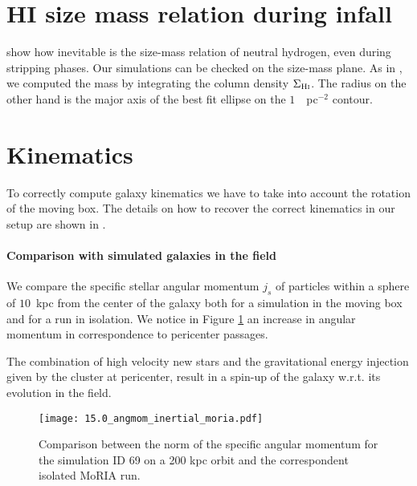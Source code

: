 \section{HI size mass relation during infall}
\citet{Stevens2019} show how inevitable is the size-mass relation of neutral hydrogen, even during stripping phases.
Our simulations can be checked on the size-mass plane.
As in \citet{Verbeke2017}, we computed the \Hi{} mass by integrating the \Hi{} column density $\Sigma_{\text{H\textsc{i}}}$. The radius on the other hand is the major axis of the best fit ellipse on the $1$~\Msun{}~pc$^{-2}$ contour.


\section{Kinematics}
To correctly compute galaxy kinematics we have to take into account the rotation of the moving box.
The details on how to recover the correct kinematics in our setup are shown in .

\paragraph{Comparison with simulated galaxies in the field}
We compare the specific stellar angular momentum $j_s$ of particles within a sphere of $10$~kpc from the center of the galaxy both for a simulation in the moving box and for a run in isolation.
We notice in Figure \ref{fig:j_s_moria} an increase in angular momentum in correspondence to pericenter passages.

The combination of high velocity new stars and the gravitational energy injection given by the cluster at pericenter, result in a spin-up of the galaxy w.r.t. its evolution in the field.

\begin{figure}
\centering
\texttt{[image: 15.0\_angmom\_inertial\_moria.pdf]}
\caption{Comparison between the norm of the specific angular momentum for the simulation ID 69 on a 200 kpc orbit and the correspondent isolated MoRIA run.}
\label{fig:j_s_moria}
\end{figure}

